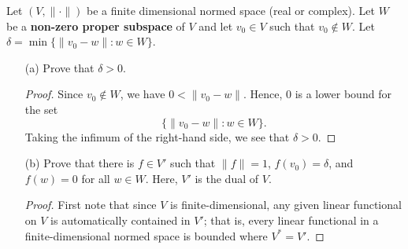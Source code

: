 \documentclass[a4paper]{article}
\begin{document}
\begin{problem}
    Let \( (V, \|\cdot\|) \) be a finite dimensional normed space (real or complex). Let \( W  \) be a \textbf{non-zero proper subspace} of \( V  \) and let \( {v}_{0} \in V  \) such that \( {v}_{0} \notin W  \). Let \( \delta = \min \{ \|{v}_{0} - w \| : w \in W  \}  \).
\end{problem}
\begin{enumerate}
    \item[(a)] Prove that \( \delta > 0  \).
        \begin{proof}
        Since \( {v}_{0} \notin W  \), we have \( 0 < \|{v}_{0} - w \| \). Hence, \( 0  \) is a lower bound for the set 
        \[  \{ \|{v}_{0} -w \| : w \in W \}.\]
        Taking the infimum of the right-hand side, we see that \( \delta > 0  \).
        \end{proof}
    \item[(b)] Prove that there is \( f \in V' \) such that \( \|f\| = 1  \), \( f({v}_{0}) = \delta \), and \( f(w) = 0  \) for all \( w \in W  \). Here, \( V'  \) is the dual of \( V  \).
        \begin{proof}
            First note that since \( V \) is finite-dimensional, any given linear functional on \( V  \) is automatically contained in \( V' \); that is, every linear functional in a finite-dimensional normed space is bounded where \( V^{*} = V' \). 


\end{proof}
\end{enumerate}
\end{document}
